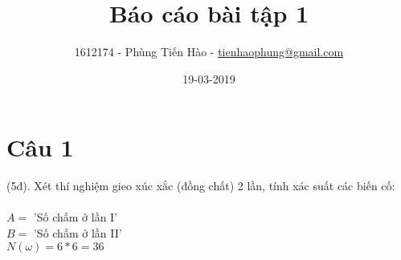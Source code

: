 \documentclass[a4paper,12pt]{article}
\title{Báo cáo bài tập 1}
\author{1612174 - Phùng Tiến Hào - \href{mailto:tienhaophung@gmail.com}{tienhaophung@gmail.com}}
\date{19-03-2019}
\begin{document}
\maketitle
\newpage

\doublespacing
\tableofcontents
\singlespace

\newpage
{}

\section{Câu 1}
\label{Cau 1}
(5đ). Xét thí nghiệm gieo xúc xắc (đồng chất) 2 lần, tính xác suất các biến cố: \\
\vspace{0.5cm}\\
$A =$ 'Số chấm ở lần I'\\
$B =$ 'Số chấm ở lần II'\\
$N(\omega) = 6 * 6 = 36$ \\
\end{document}
